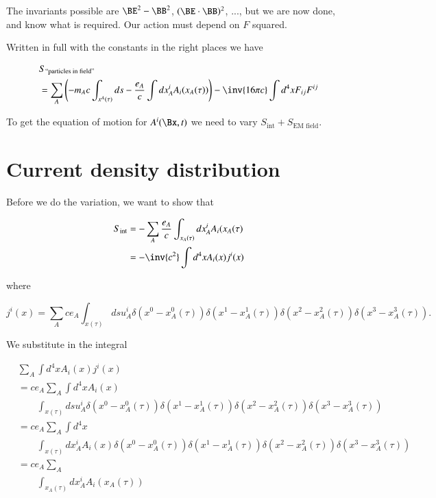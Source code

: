 The invariants possible are \(\BE^2 - \BB^2\), \((\BE \cdot \BB)^2\), ..., but we are now done, and know what is required.  Our action must depend on \(F\) squared.

Written in full with the constants in the right places we have

\begin{equation}\label{eqn:relativisticElectrodynamicsL12b:370}
\begin{aligned}
&S_{\text{``particles in field''}} \\
&= \sum_A \left( -m_A c \int_{x^A(\tau)} ds - \frac{e_A}{c} \int dx^i_A A_i(x_A(\tau))
\right)
- \inv{16 \pi c} \int d^4 x F_{ij} F^{ij}
\end{aligned}
\end{equation}

To get the equation of motion for \(A^i(\Bx, t)\) we need to vary \(S_{\text{int}} + S_{\text{EM field}}\).

\section{Current density distribution}

Before we do the variation, we want to show that

\begin{equation}\label{eqn:relativisticElectrodynamicsL12b:590}
\begin{aligned}
S_{\text{int}}
&= -\sum_A \frac{e_A}{c} \int_{x_A(\tau)} dx^i_A A_i(x_A(\tau) \\
&= -\inv{c^2} \int d^4 x A_i(x) j^i(x)
\end{aligned}
\end{equation}

where

\begin{equation}\label{eqn:relativisticElectrodynamicsL12b:390}
j^i(x) =
\sum_A c e_A \int_{x(\tau)}
ds u^i_A
\delta(x^0 - x^0_A(\tau))
\delta(x^1 - x^1_A(\tau))
\delta(x^2 - x^2_A(\tau))
\delta(x^3 - x^3_A(\tau)).
\end{equation}

We substitute in the integral

\begin{equation}\label{eqn:relativisticElectrodynamicsL12b:610}
\begin{aligned}
&\sum_A \int d^4 x A_i(x) j^i(x) \\
&=
c e_A \sum_A \int d^4 x A_i(x) \\
&\qquad \int_{x(\tau)}
ds u^i_A
\delta(x^0 - x^0_A(\tau))
\delta(x^1 - x^1_A(\tau))
\delta(x^2 - x^2_A(\tau))
\delta(x^3 - x^3_A(\tau)) \\
&=
c e_A \sum_A
\int d^4 x \\
&\qquad \int_{x(\tau)}
dx^i_A
A_i(x)
\delta(x^0 - x^0_A(\tau))
\delta(x^1 - x^1_A(\tau))
\delta(x^2 - x^2_A(\tau))
\delta(x^3 - x^3_A(\tau)) \\
&=
c e_A \sum_A \\
&\qquad \int_{x_A(\tau)}
dx^i_A
A_i(x_A(\tau))
\end{aligned}
\end{equation}

